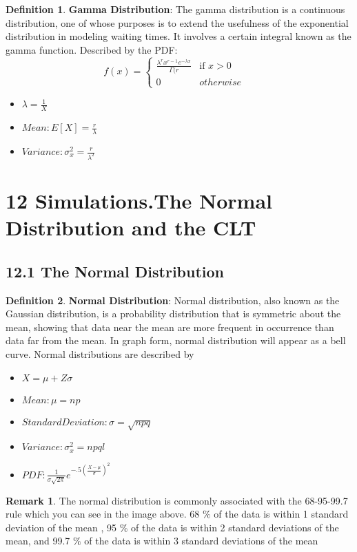 \documentclass[12pt]{amsart}
\theoremstyle{definition}
\newtheorem{definition}{Definition} %
\newtheorem*{remark}{Remark}        %
\numberwithin{equation}{theorem}    %
\begin{document}
\begin{definition}
    \textbf{Gamma Distribution}:
    The gamma distribution is a continuous distribution, one of whose purposes is to extend the usefulness of the exponential distribution in modeling waiting times. It involves a certain integral known as the gamma function. 
    Described by the PDF:
    $$f(x) = \begin{cases}
        \frac{\lambda^rx^{r-1}e^{-\lambda x}}{\Gamma(r} & \text{if } x > 0 \\
        0  & otherwise
  \end{cases} \quad$$
  \begin{itemize}
    \item $\lambda = \frac{1}{X}$
    \item $Mean:E[X] = \frac{r}{\lambda}$
    \item $Variance: \sigma_x^2 = \frac{r}{\lambda^2}$
\end{itemize}
\end{definition}


\section*{12 Simulations.The Normal Distribution and the CLT}

\subsection*{12.1 The Normal Distribution}


\begin{definition}
    \textbf{Normal Distribution}:
    Normal distribution, also known as the Gaussian distribution, is a probability distribution that is symmetric about the mean, showing that data near the mean are more frequent in occurrence than data far from the mean. In graph form, normal distribution will appear as a bell curve. Normal distributions are described by 

    \begin{itemize}
        \item $X = \mu + Z\sigma$
        \item $Mean:\mu= np$
        \item $Standard Deviation: \sigma = \sqrt{npq}$
        \item $Variance: \sigma_x^2 = npql$
        \item $PDF: \frac{1}{\sigma \sqrt{2\pi}}e^{-.5(\frac{X-\mu}{\sigma})^2}$
    \end{itemize}
    \begin{remark}
        The normal distribution is commonly associated with the 68-95-99.7 rule which you can see in the image above. 68 $\%$ of the data is within 1 standard deviation of the mean , 95 $\%$ of the data is within 2 standard deviations of the mean, and 99.7 $\%$ of the data is within 3 standard deviations of the mean
    \end{remark}
\end{definition}
\end{document}
